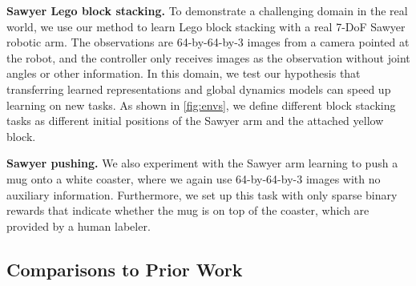 {\bf Sawyer Lego block stacking.} To demonstrate a challenging domain in the real world, we use our method to learn Lego block stacking with a real 7-DoF Sawyer robotic arm. The observations are \mbox{64-by-64-by-3} images from a camera pointed at the robot, and the controller only receives images as the observation without joint angles or other information. In this domain, we test our hypothesis that transferring learned representations and global dynamics models can speed up learning on new tasks. As shown in \autoref{fig:envs}, we define different block stacking tasks as different initial positions of the Sawyer arm and the attached yellow block.

{\bf Sawyer pushing.} We also experiment with the Sawyer arm learning to push a mug onto a white coaster, where we again use \mbox{64-by-64-by-3} images with no auxiliary information. Furthermore, we set up this task with only sparse binary rewards that indicate whether the mug is on top of the coaster, which are provided by a human labeler.

\subsection{Comparisons to Prior Work}

